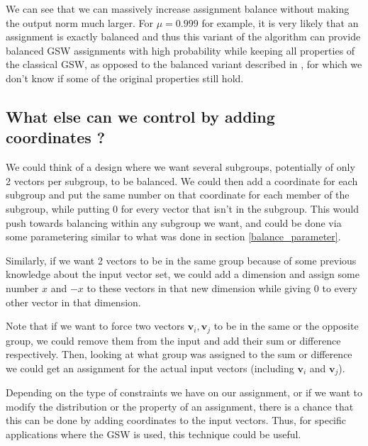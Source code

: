 \documentclass[12pt]{article}
\begin{document}
We can see that we can massively increase assignment balance without making the output norm much larger. For $\mu=0.999$ for example, it is very likely that an assignment is exactly balanced and thus this variant of the algorithm can provide balanced GSW assignments with high probability while keeping all properties of the classical GSW, as opposed to the balanced variant described in \cite{harshaw2019balancing}, for which we don't know if some of the original properties still hold. %

\subsection{What else can we control by adding coordinates ?}
We could think of a design where we want several subgroups, potentially of only 2 vectors per subgroup, to be balanced. We could then add a coordinate for each subgroup and put the same number on that coordinate for each member of the subgroup, while putting 0 for every vector that isn't in the subgroup. This would push towards balancing within any subgroup we want, and could be done via some parametering similar to what was done in section \ref{balance_parameter}. 

Similarly, if we want 2 vectors to be in the same group because of some previous knowledge about the input vector set, we could add a dimension and assign some number $x$ and $-x$ to these vectors in that new dimension while giving 0 to every other vector in that dimension.

Note that if we want to force two vectors $\textbf{v}_i,\textbf{v}_j$ to be in the same or the opposite group, we could remove them from the input and add their sum or difference respectively. Then, looking at what group was assigned to the sum or difference we could get an assignment for the actual input vectors (including $\textbf{v}_i$ and $\textbf{v}_j$).

Depending on the type of constraints we have on our assignment, or if we want to modify the distribution or the property of an assignment, there is a chance that this can be done by adding coordinates to the input vectors. Thus, for specific applications where the GSW is used, this technique could be useful.



\end{document}
